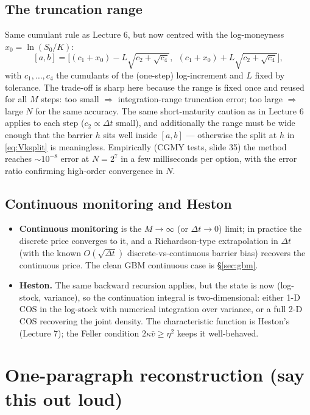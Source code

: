 \documentclass[11pt]{article}
\begin{document}
\subsection{The truncation range}\label{sec:range}
Same cumulant rule as Lecture 6, but now centred with the log-moneyness $x_0=\ln(S_0/K)$:
\begin{equation}\label{eq:range}
[a,b]=\Big[(c_1+x_0)-L\sqrt{c_2+\sqrt{c_4}},\ \ (c_1+x_0)+L\sqrt{c_2+\sqrt{c_4}}\Big],
\end{equation}
with $c_1,\dots,c_4$ the cumulants of the (one-step) log-increment and $L$ fixed by tolerance. The trade-off is
sharp here because the range is fixed once and reused for all $M$ steps: too small $\Rightarrow$
integration-range truncation error; too large $\Rightarrow$ large $N$ for the same accuracy. The same
short-maturity caution as in Lecture 6 applies to each step ($c_2\propto\Delta t$ small), and additionally the
range must be wide enough that the barrier $h$ sits well inside $[a,b]$ --- otherwise the split at $h$ in
\eqref{eq:Vksplit} is meaningless. Empirically (CGMY tests, slide 35) the method reaches $\sim10^{-8}$ error at
$N=2^7$ in a few milliseconds per option, with the error ratio confirming high-order convergence in $N$.

\subsection{Continuous monitoring and Heston}
\begin{itemize}[leftmargin=*]
  \item \textbf{Continuous monitoring} is the $M\to\infty$ (or $\Delta t\to0$) limit; in practice the discrete
  price converges to it, and a Richardson-type extrapolation in $\Delta t$ (with the known $O(\sqrt{\Delta t})$
  discrete-vs-continuous barrier bias) recovers the continuous price. The clean GBM continuous case is
  \S\ref{sec:gbm}.
  \item \textbf{Heston.} The same backward recursion applies, but the state is now (log-stock, variance), so
  the continuation integral is two-dimensional: either 1-D COS in the log-stock with numerical integration over
  variance, or a full 2-D COS recovering the joint density. The characteristic function is Heston's
  (Lecture 7); the Feller condition $2\kappa\bar v\ge\eta^2$ keeps it well-behaved.
\end{itemize}

\section{One-paragraph reconstruction (say this out loud)}
\end{document}
